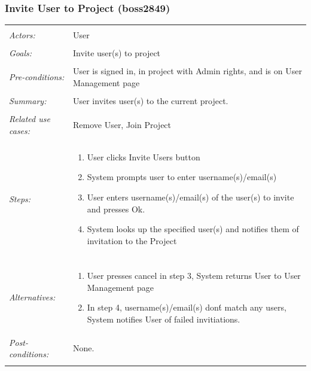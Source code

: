 \documentclass[11pt]{report}
\begin{document}
\subsubsection{Invite User to Project  (boss2849)}
\begin{tabular}{ p{2cm} p{12cm} }
 \hline
 \\
 \textit{Actors:} & User \\ 
 \\
 \textit{Goals:} & Invite user(s) to project \\
 \\
 \textit{Pre-conditions:} & User is signed in, in project with Admin rights, and is on User Management page \\
 \\
 \textit{Summary:} & User invites user(s) to the current project. \\ 
 \\
 \textit{Related use cases:} & Remove User, Join Project \\ 
 \\
 \textit{Steps:} & \begin{enumerate}
  \item User clicks Invite Users button
  \item System prompts user to enter username(s)/email(s)
  \item User enters username(s)/email(s) of the user(s) to invite and presses Ok.
  \item System looks up the specified user(s) and notifies them of invitation to the Project
 \end{enumerate} \\
 \\
 \textit{Alternatives:} & \begin{enumerate}
  \item User presses cancel in step 3, System returns User to User Management page
  \item In step 4, username(s)/email(s) don\'t match any users, System notifies User of failed invitiations.
 \end{enumerate} 
 \\
 \textit{Post-conditions:} & None. \\
 \\
\hline
\end{tabular}
\end{document}

